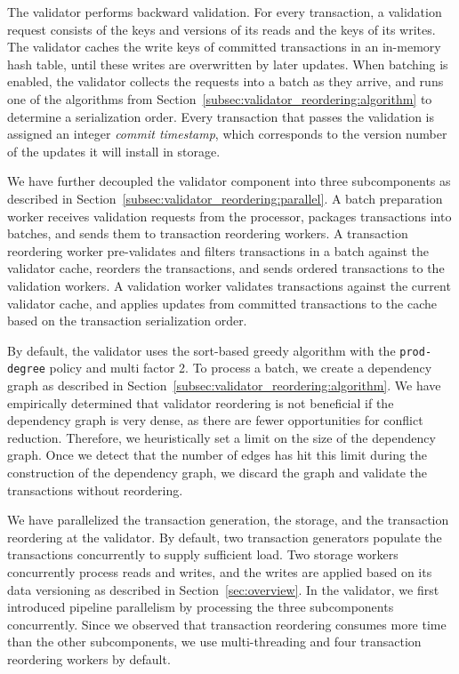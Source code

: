 The validator performs backward validation. For every transaction, a validation request consists of the keys and versions of its reads and the keys of its writes. The validator caches the write keys of committed transactions in an in-memory hash table, until these writes are overwritten by later updates. When batching is enabled, the validator collects the requests into a batch as they arrive, and runs one of the algorithms from Section~\ref{subsec:validator_reordering:algorithm} to determine a serialization order. Every transaction that passes the validation is assigned an integer \emph{commit timestamp}, which corresponds to the version number of the updates it will install in storage. 

We have further decoupled the validator component into three subcomponents as described in Section~\ref{subsec:validator_reordering:parallel}. A batch preparation worker receives validation requests from the processor, packages transactions into batches, and sends them to transaction reordering workers. A transaction reordering worker pre-validates and filters transactions in a batch against the validator cache, reorders the transactions, and sends ordered transactions to the validation workers. A validation worker validates transactions against the current validator cache, and applies updates from committed transactions to the cache based on the transaction serialization order. 

By default, the validator uses the sort-based greedy algorithm with the \texttt{prod-degree} policy and multi factor 2. To process a batch, we create a dependency graph as described in Section~\ref{subsec:validator_reordering:algorithm}. We have empirically determined that validator reordering is not beneficial if the dependency graph is very dense, as there are fewer opportunities for conflict reduction. Therefore, we heuristically set a limit on the size of the dependency graph. Once we detect that the number of edges has hit this limit during the construction of the dependency graph, we discard the graph and validate the transactions without reordering. 

We have parallelized the transaction generation, the storage, and the transaction reordering at the validator. By default, two transaction generators populate the transactions concurrently to supply sufficient load. Two storage workers concurrently process reads and writes, and the writes are applied based on its data versioning as described in Section~\ref{sec:overview}. In the validator, we first introduced pipeline parallelism by processing the three subcomponents concurrently. Since we observed that transaction reordering consumes more time than the other subcomponents, we use multi-threading and four transaction reordering workers by default.

